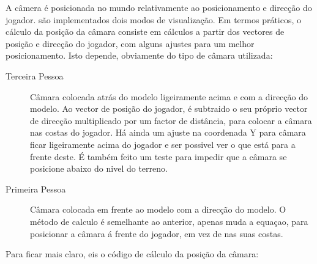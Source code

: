 


A câmera é posicionada no mundo relativamente ao posicionamento e direcção do jogador. são implementados dois modos de visualização.
Em termos práticos, o cálculo da posição da câmara consiste em cálculos a partir dos vectores de posição e direcção do jogador, com alguns ajustes para um melhor posicionamento. Isto depende, obviamente do tipo de câmara utilizada:

\begin{description}
\item[Terceira Pessoa] Câmara colocada atrás do modelo ligeiramente acima e com a direcção do modelo. Ao vector de posição do jogador, é subtraido o seu próprio vector de direcção multiplicado por um factor de distância, para colocar a câmara nas costas do jogador. Há ainda um ajuste na coordenada Y para câmara ficar ligeiramente acima do jogador e ser possivel ver o que está para a frente deste. É também feito um teste para impedir que a câmara se posicione abaixo do nivel do terreno.
\item[Primeira Pessoa] Câmara colocada em frente ao modelo com a direcção do modelo. O método de calculo é semelhante ao anterior, apenas muda a equaçao, para posicionar a câmara á frente do jogador, em vez de nas suas costas.
\end{description}

Para ficar mais claro, eis o código de cálculo da posição da câmara:

